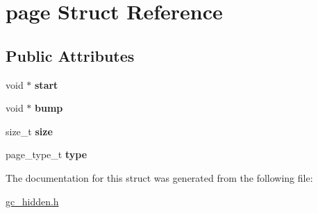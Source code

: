 \hypertarget{structpage}{}\section{page Struct Reference}
\label{structpage}
\subsection*{Public Attributes}
\begin{DoxyCompactItemize}
\item 
\hypertarget{structpage_a2b3f55e00ff29b84992b5b47f72fb72d}{}void $\ast$ {\bfseries start}\label{structpage_a2b3f55e00ff29b84992b5b47f72fb72d}

\item 
\hypertarget{structpage_a6ad4c9be69d661d94b74fbb7b41f7d3d}{}void $\ast$ {\bfseries bump}\label{structpage_a6ad4c9be69d661d94b74fbb7b41f7d3d}

\item 
\hypertarget{structpage_a077b5c879b7825ab21dad61d96ea9b65}{}size\+\_\+t {\bfseries size}\label{structpage_a077b5c879b7825ab21dad61d96ea9b65}

\item 
\hypertarget{structpage_ab70c0798f1e3ad36842dd8a1454d2b21}{}page\+\_\+type\+\_\+t {\bfseries type}\label{structpage_ab70c0798f1e3ad36842dd8a1454d2b21}

\end{DoxyCompactItemize}


The documentation for this struct was generated from the following file\+:\begin{DoxyCompactItemize}
\item 
\hyperlink{gc__hidden_8h}{gc\+\_\+hidden.\+h}\end{DoxyCompactItemize}
